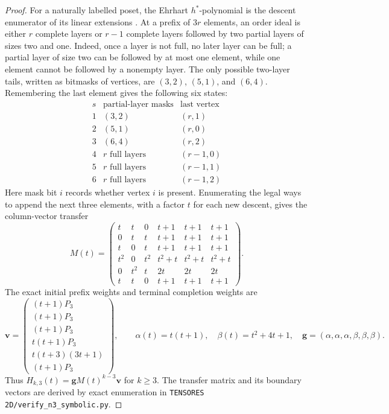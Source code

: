 \documentclass[11pt,a4paper]{article}
\theoremstyle{definition}
\begin{document}
\begin{proof}
For a naturally labelled poset, the Ehrhart $h^*$-polynomial is the
descent enumerator of its linear extensions \cite{Stanley1986}. At a
prefix of $3r$ elements, an order ideal is either $r$ complete layers or
$r-1$ complete layers followed by two partial layers of sizes two and one.
Indeed, once a layer is not full, no later layer can be full; a partial
layer of size two can be followed by at most one element, while one
element cannot be followed by a nonempty layer. The only possible
two-layer tails, written as bitmasks of vertices, are $(3,2)$, $(5,1)$,
and $(6,4)$. Remembering the last element gives the following six states:
\[
\begin{array}{c|c|c}
s&\text{partial-layer masks}&\text{last vertex}\\ \hline
1&(3,2)&(r,1)\\
2&(5,1)&(r,0)\\
3&(6,4)&(r,2)\\
4&\text{$r$ full layers}&(r-1,0)\\
5&\text{$r$ full layers}&(r-1,1)\\
6&\text{$r$ full layers}&(r-1,2)
\end{array}
\]
Here mask bit $i$ records whether vertex $i$ is present. Enumerating
the legal ways to append the next three elements, with a factor $t$
for each new descent, gives the column-vector transfer
\[
M(t)=
\begin{pmatrix}
t&t&0&t+1&t+1&t+1\\
0&t&t&t+1&t+1&t+1\\
t&0&t&t+1&t+1&t+1\\
t^2&0&t^2&t^2+t&t^2+t&t^2+t\\
0&t^2&t&2t&2t&2t\\
t&t&0&t+1&t+1&t+1
\end{pmatrix}.
\]
The exact initial prefix weights and terminal completion weights are
\[
\mathbf v=
\begin{pmatrix}
(t+1)P_3\\(t+1)P_3\\(t+1)P_3\\
t(t+1)P_3\\t(t+3)(3t+1)\\(t+1)P_3
\end{pmatrix},
\qquad
\alpha(t)=t(t+1),\quad \beta(t)=t^2+4t+1,\quad
\mathbf g=(\alpha,\alpha,\alpha,\beta,\beta,\beta).
\]
Thus $H_{k,3}(t)=\mathbf gM(t)^{k-3}\mathbf v$ for $k\ge3$.
The transfer matrix and its boundary vectors are derived by exact
enumeration in \texttt{TENSORES 2D/verify\_n3\_symbolic.py}.


\end{proof}
\end{document}

